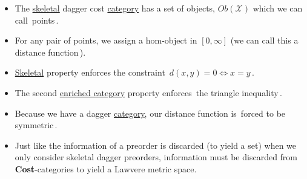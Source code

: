 \begin{itemize}
    \item The \hyperref[D1.35]{skeletal} dagger cost \hyperref[D2.46]{category} has a set of objects, $Ob(\mathcal{X})$ which we can call \,points\,.
    \item For any pair of points, we assign a hom-object in $[0,\infty]$ (we can call this a \,distance function\,).
    \item \hyperref[D1.35]{Skeletal} property enforces the constraint \,$d(x,y)=0 \iff x=y$\,.
    \item The second \hyperref[D2.46]{enriched category} property enforces \,the triangle inequality\,.
    \item Because we have a dagger \hyperref[D2.46]{category}, our distance function is \,forced to be symmetric\,.
    \item Just like the information of a preorder is discarded (to yield a set) when we only consider skeletal dagger preorders, information must be discarded from \textbf{Cost}-categories to yield a Lawvere metric space.

  \end{itemize}
